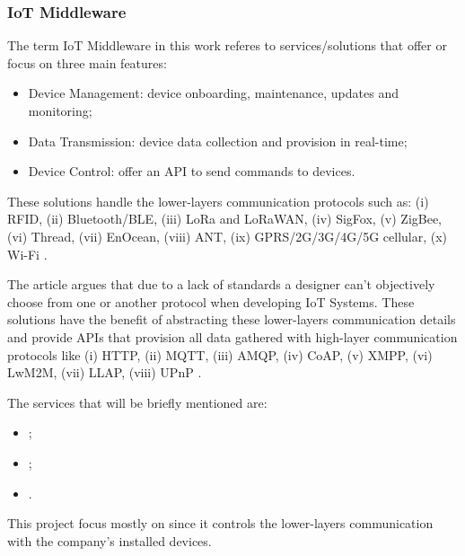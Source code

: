 \subsubsection{IoT Middleware}
\label{subsubsec:stateofart:arch:infra:middleware}

The term \gls{IoT} Middleware in this work referes to services/solutions that offer or focus on three main features:

\begin{itemize}
    \item Device Management: device onboarding, maintenance, updates and monitoring;
    \item Data Transmission: device data collection and provision in real-time;
    \item Device Control: offer an \gls{API} to send commands to devices. 
\end{itemize}

These solutions handle the lower-layers communication protocols such as: (i) RFID, (ii) Bluetooth/BLE, (iii) LoRa and LoRaWAN, (iv) SigFox, (v) ZigBee, (vi) Thread, (vii) EnOcean, (viii) ANT, (ix) GPRS/2G/3G/4G/5G cellular, (x) Wi-Fi \parencite{DIAS2022100529}.

The article  argues that due to a lack of standards a designer can't objectively choose from one or another protocol when developing \gls{IoT} Systems. These solutions have the benefit of abstracting these lower-layers communication details and provide \gls{API}s that provision all data gathered with high-layer communication protocols like (i) HTTP, (ii) \gls{MQTT}, (iii) \gls{AMQP}, (iv) CoAP, (v) XMPP, (vi) LwM2M, (vii) LLAP, (viii) UPnP \parencite{DIAS2022100529}.

The services that will be briefly mentioned are:

\begin{itemize}
    \item {};
    \item {};
    \item {}.
\end{itemize}

This project focus mostly on  since it controls the lower-layers communication with the company's installed devices.

